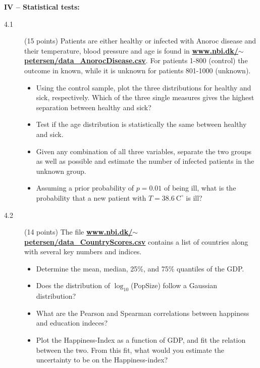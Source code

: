 \documentclass[11pt]{article}
\begin{document}
\noindent
{\bf IV -- Statistical tests:}
\begin{description}
\item[4.1] (15 points)
  Patients are either healthy or infected with Anoroc disease and their temperature, blood pressure and age is found in
  \href{http://www.nbi.dk/~petersen/data\_AnorocDisease.txt}{\bf www.nbi.dk/$\sim$petersen/data\_AnorocDisease.csv}.
  For patients 1-800 (control) the outcome in known, while it is unknown for patients 801-1000 (unknown).
  \vspace*{-1ex}
  \begin{itemize}
    \item Using the control sample, plot the three distributions for healthy and sick, respectively.
      Which of the three single measures gives the highest separation between healthy and sick?
    \item Test if the age distribution is statistically the same between healthy and sick.
    \item Given any combination of all three variables, separate the two groups as well as possible
      and estimate the number of infected patients in the unknown group.
    \item Assuming a prior probability of $p=0.01$ of being ill, what is the probability that a new patient with
      $T = 38.6~ \mbox{C}^{\circ}$ is ill?
  \end{itemize}
\item[4.2] (14 points)
  The file \href{http://www.nbi.dk/~petersen/data\_CountryScores.txt}{\bf www.nbi.dk/$\sim$petersen/data\_CountryScores.csv}
  contains a list of countries along with several key numbers and indices.
  \vspace*{-1ex}
  \begin{itemize}
    \item Determine the mean, median, 25\%, and 75\% quantiles of the GDP.
    \item Does the distribution of $\log_{10}$(PopSize) follow a Gaussian distribution?
    \item What are the Pearson and Spearman correlations between happiness and education indeces?
    \item Plot the Happiness-Index as a function of GDP, and fit the relation between the two.
      From this fit, what would you estimate the uncertainty to be on the Happiness-index?
  \end{itemize}
\end{description}
\end{document}
